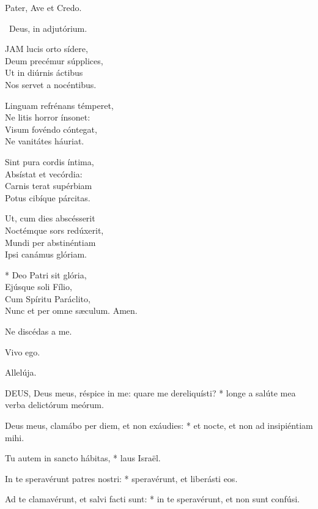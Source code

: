 Pater, Ave et Credo.

\V\ Deus, in adjutórium.


\lettrine[lines=2]{J}{AM} lucis orto sídere,\\
Deum precémur súpplices,\\
Ut in diúrnis áctibus\\
Nos servet a nocéntibus.

Linguam refrénans témperet,\\
Ne litis horror ínsonet:\\
Visum fovéndo cóntegat,\\
Ne vanitátes háuriat.

Sint pura cordis íntima,\\
Absístat et vecórdia:\\
Carnis terat supérbiam\\
Potus cibíque párcitas.

Ut, cum dies abscésserit\\
Noctémque sors redúxerit,\\
Mundi per abstinéntiam\\
Ipsi canámus glóriam.

* Deo Patri sit glória,\\
Ejúsque soli Fílio,\\
Cum Spíritu Paráclito,\\
Nunc et per omne sæculum. Amen.

  Ne discédas a me.



 Vivo ego.

  Allelúja.


\lettrine[lines=2]{D}{EUS}, Deus meus, réspice in me: quare me dereliquísti? * longe a salúte mea verba delictórum meórum.

Deus meus, clamábo per diem, et non exáudies: * et nocte, et non ad insipiéntiam mihi.

Tu autem in sancto hábitas, * laus Israël.

In te speravérunt patres nostri: * speravérunt, et liberásti eos.

Ad te clamavérunt, et salvi facti sunt: * in te speravérunt, et non sunt confúsi.

